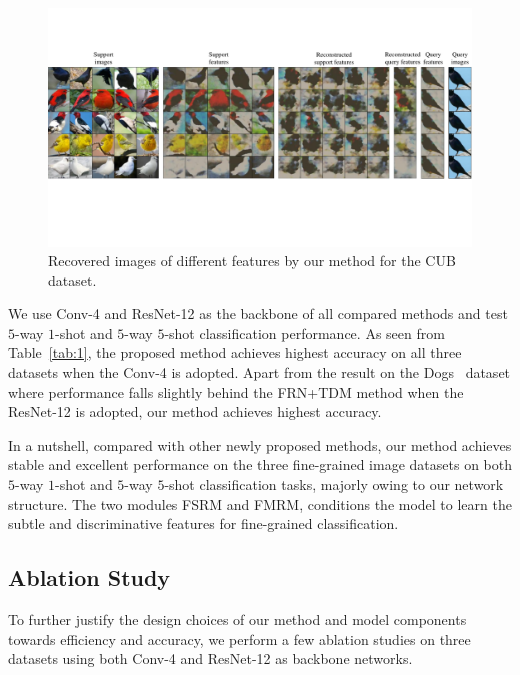 \documentclass[letterpaper]{article} %
\begin{document}
\begin{figure}[ht]
  \centering
  \includegraphics[width=0.8\linewidth]{figures/5.pdf}
  \caption{Recovered images of different features by our method for the CUB dataset. }
  \label{fig:visualize}
\end{figure}

We use Conv-4 and ResNet-12 as the backbone of all compared methods and test $5$-way $1$-shot and $5$-way $5$-shot classification performance.
As seen from Table~\ref{tab:1}, the proposed method achieves highest accuracy on all three datasets when the Conv-4 is adopted.
Apart from the result on the {Dogs}~\cite{KhoslaYaoJayadevaprakashFeiFei_FGVC2011} dataset where performance falls slightly behind the FRN+TDM method when the ResNet-12 is adopted, our method achieves highest accuracy.


In a nutshell, compared with other newly proposed methods, our method achieves stable and excellent performance on the three fine-grained image datasets on both $5$-way $1$-shot and $5$-way $5$-shot classification tasks, majorly owing to our network structure. The two modules FSRM and FMRM, conditions the model to learn the subtle and discriminative features for fine-grained classification.


\subsection{Ablation Study}\label{Ablation}







To further justify the design choices of our method and model components towards efficiency and accuracy, we perform a few ablation studies on three datasets using both Conv-4 and ResNet-12 as backbone networks.
\end{document}
